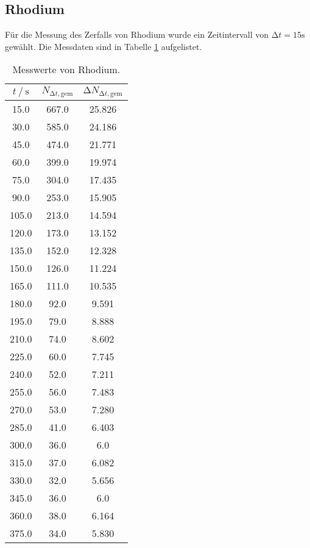 \subsection{Rhodium}

Für die Messung des Zerfalls von Rhodium wurde ein Zeitintervall von 
$\increment t = 15 \si{\s}$ gewählt. Die Messdaten sind in Tabelle \ref{tab:rhowerte}
aufgelistet.

\begin{table}
 \centering
 \caption{Messwerte von Rhodium.}
 \label{tab:rhowerte}
 \begin{tabular}{c c c}
  \toprule
  {$t \mathbin{/} \si{\s}$} & {$N_{\increment t, \text{gem}}$} & {$\increment N_{\increment t, \text{gem}}$}\\
  \midrule
  15.0    & 667.0  & 25.826 \\
  30.0    & 585.0  & 24.186  \\  
  45.0    & 474.0  & 21.771  \\  
  60.0    & 399.0  & 19.974  \\  
  75.0    & 304.0  & 17.435  \\  
  90.0    & 253.0  & 15.905  \\  
  105.0   & 213.0  & 14.594  \\  
  120.0   & 173.0  & 13.152  \\  
  135.0   & 152.0  & 12.328  \\  
  150.0   & 126.0  & 11.224  \\  
  165.0   & 111.0  & 10.535  \\  
  180.0   & 92.0   & 9.591  \\  
  195.0   & 79.0   & 8.888  \\  
  210.0   & 74.0   & 8.602  \\  
  225.0   & 60.0   & 7.745  \\  
  240.0   & 52.0   & 7.211  \\  
  255.0   & 56.0   & 7.483  \\  
  270.0   & 53.0   & 7.280  \\  
  285.0   & 41.0   & 6.403  \\  
  300.0   & 36.0   & 6.0     \\  
  315.0   & 37.0   & 6.082  \\  
  330.0   & 32.0   & 5.656  \\  
  345.0   & 36.0   & 6.0    \\  
  360.0   & 38.0   & 6.164  \\  
  375.0   & 34.0   & 5.830  \\  

\end{tabular}
\end{table}
